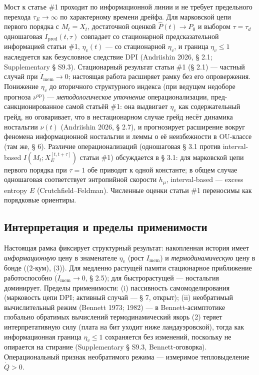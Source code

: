 \documentclass[pdflatex,sn-mathphys-ay]{sn-jnl}
\begin{document}
Мост к статье \#1 проходит по информационной линии и не требует предельного перехода \(\tau_E \to \infty\) по характерному времени дрейфа. Для марковской цепи первого порядка с \(M_t = X_t\), достаточной оценкой \(\hat P(t) \to P_0\) и выбором \(\tau = \tau_d\) одношаговая \(I_{\text{pred}}(t,\tau)\) совпадает со стационарной предсказательной информацией статьи \#1, \(\eta_v(t)\) --- со стационарной \(\eta_v\), и граница \(\eta_v \le 1\) наследуется как безусловное следствие DPI (Andriishin 2026, § 2.1; Supplementary § S9.3). Стационарный результат статьи \#1 (§ 2.1) --- частный случай при \(\dot I_{\text{mem}} \to 0\); настоящая работа расширяет рамку без его опровержения. Понижение \(\eta_v\) до вторичного структурного индекса (при ведущем недоборе прогноза \(\nu^{\text{op}}\)) --- \emph{методологическое уточнение} операционализации, пред-санкционированное самой статьёй \#1: она выдвигает \(\eta_v\) как содержательный грейд, но оговаривает, что в нестационарном случае грейд несёт динамика ностальгии \(\nu(t)\) (Andriishin 2026, § 2.7), и прогнозирует расширение вокруг феномена информационной ностальгии и леммы о её неизбежности в OU-классе (там же, § 6). Различие операционализаций (одношаговая § 3.1 против interval-based \(I(M_t; X_E^{[t,t+\tau]})\) статьи \#1) обсуждается в § 3.1: для марковской цепи первого порядка при \(\tau = 1\) обе приводят к одной константе; в общем случае одношаговая соответствует энтропийной скорости \(h_\mu\), interval-based --- excess entropy \(E\) (Crutchfield--Feldman). Численные оценки статьи \#1 переносимы как порядковые ориентиры.



\subsection{Интерпретация и пределы применимости}\label{ux438ux43dux442ux435ux440ux43fux440ux435ux442ux430ux446ux438ux44f-ux438-ux43fux440ux435ux434ux435ux43bux44b-ux43fux440ux438ux43cux435ux43dux438ux43cux43eux441ux442ux438}



Настоящая рамка фиксирует структурный результат: накопленная история имеет \emph{информационную} цену в знаменателе \(\eta_v\) (рост \(I_{\text{mem}}\)) и \emph{термодинамическую} цену в бонде ((2-кум), (3)). Для медленно растущей памяти стационарное приближение работоспособно (\(\dot I_{\text{mem}} \to 0\), § 2.5); для быстрорастущей --- ностальгия доминирует. Пределы применимости: (i) пассивность самомоделирования (марковость цепи DPI; активный случай --- § 7, открыт); (ii) необратимый вычислительный режим (Bennett 1973; 1982) --- в Bennett-асимптотике глобально обратимых вычислений термодинамический якорь (2) теряет интерпретативную силу (плата на бит уходит ниже ландауэровской), тогда как информационная граница \(\eta_v \le 1\) сохраняется без изменений, поскольку не опирается на стирание (Supplementary § S9.3, Bennett-оговорка). Операциональный признак необратимого режима --- измеримое тепловыделение \(\dot Q > 0\).
\end{document}
